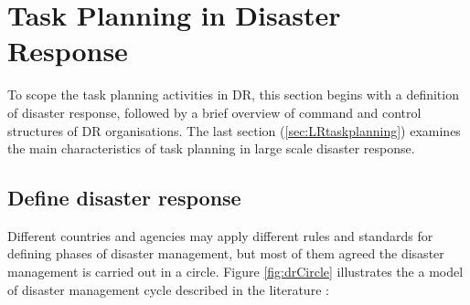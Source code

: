 
\section{Task Planning in Disaster Response}\label{sec:lrplanning}
To scope the task planning activities in \ac{DR}, this section begins with a definition of disaster response, followed by a brief overview of command and control structures of \ac{DR} organisations. The last section (\ref{sec:LRtaskplanning}) examines the main characteristics of task planning in large scale disaster response.\\

\subsection{Define disaster response}
Different countries and agencies may apply different rules and standards for defining phases of disaster management, but most of them agreed the disaster management is carried out in a circle. Figure \ref{fig:drCircle} illustrates the a model of disaster management cycle described in the literature \cite{Wattegama2012} :\\

